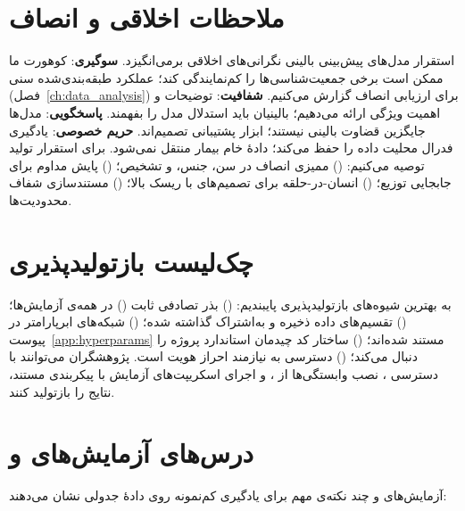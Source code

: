 \section{ملاحظات اخلاقی و انصاف}

استقرار مدل‌های پیش‌بینی بالینی نگرانی‌های اخلاقی برمی‌انگیزد. \textbf{سوگیری}: کوهورت ما ممکن است برخی جمعیت‌شناسی‌ها را کم‌نمایندگی کند؛ عملکرد طبقه‌بندی‌شده سنی (فصل~\ref{ch:data_analysis}) برای ارزیابی انصاف گزارش می‌کنیم. \textbf{شفافیت}: توضیحات  و اهمیت ویژگی ارائه می‌دهیم؛ بالینیان باید استدلال مدل را بفهمند. \textbf{پاسخگویی}: مدل‌ها جایگزین قضاوت بالینی نیستند؛ ابزار پشتیبانی تصمیم‌اند. \textbf{حریم خصوصی}: یادگیری فدرال محلیت داده را حفظ می‌کند؛ دادۀ خام بیمار منتقل نمی‌شود. برای استقرار تولید توصیه می‌کنیم: () ممیزی انصاف در سن، جنس، و تشخیص؛ () پایش مداوم برای جابجایی توزیع؛ () انسان-در-حلقه برای تصمیم‌های با ریسک بالا؛ () مستندسازی شفاف محدودیت‌ها.

\section{چک‌لیست بازتولیدپذیری}

به بهترین شیوه‌های بازتولیدپذیری پایبندیم: () بذر تصادفی ثابت () در همه‌ی آزمایش‌ها؛ () تقسیم‌های داده ذخیره و به‌اشتراک گذاشته شده؛ () شبکه‌های ابرپارامتر در پیوست~\ref{app:hyperparams} مستند شده‌اند؛ () ساختار کد چیدمان استاندارد پروژه را دنبال می‌کند؛ () دسترسی به  نیازمند احراز هویت  است. پژوهشگران می‌توانند با دسترسی ، نصب وابستگی‌ها از \texttt{}، و اجرای اسکریپت‌های آزمایش با پیکربندی مستند، نتایج را بازتولید کنند.

\section{درس‌های آزمایش‌های  و }

آزمایش‌های  و  چند نکته‌ی مهم برای یادگیری کم‌نمونه روی دادۀ جدولی نشان می‌دهند:

